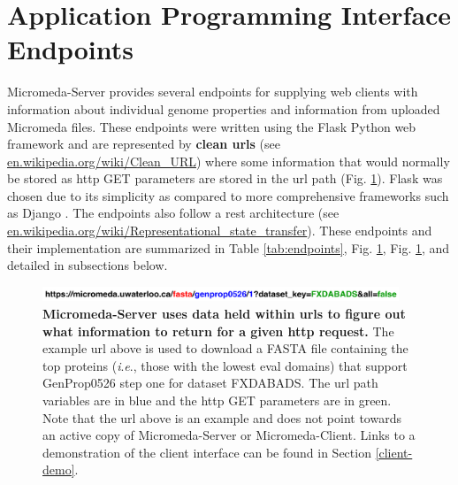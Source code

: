 \section{Application Programming Interface Endpoints} \label{endpoints}

Micromeda-Server provides several endpoints for supplying web clients with 
information about individual genome properties and information from uploaded 
Micromeda files. These endpoints were written using the Flask Python web 
framework \cite{grinberg2018flask} and are represented by \textbf{clean 
\gls{url}s} (see 
\href{http://en.wikipedia.org/wiki/Clean_URL}{en.wikipedia.org/wiki/Clean\_URL}) 
where some information that would normally be stored as \gls{http} GET 
parameters are stored in the \gls{url} path (Fig. \ref{fig:endpoint-url}). Flask 
was chosen due to its simplicity as compared to more comprehensive frameworks 
such as Django \cite{holovaty2009definitive}. The endpoints also follow a 
\gls{rest} architecture \cite{fielding2000representational} (see 
\href{http://en.wikipedia.org/wiki/Representational_state_transfer}{en.wikipedia.org/wiki/Representational\_state\_transfer}). 
These endpoints and their implementation are summarized in Table 
\ref{tab:endpoints}, Fig. \ref{endpoints}, Fig. \ref{fig:endpoint-url}, and 
detailed in subsections below.

\begin{figure}[!ht]
  \centering
	\includegraphics[width=0.95\textwidth]{media/Coloured-Endpoint.pdf}
	 \caption[Micromeda-Server uses data held within URLs to figure out what 
information to return for a given HTTP request.]{\textbf{Micromeda-Server uses 
data held within \gls{url}s to figure out what information to return for a given 
\gls{http} request.} The example \gls{url} above is used to download a FASTA 
file containing the top proteins (\textit{i}.\textit{e}., those with the lowest \gls{eval} 
domains) that support GenProp0526 step one for dataset FXDABADS. The \gls{url} 
path variables are in blue and the \gls{http} GET parameters are in green. Note 
that the \gls{url} above is an example and does not point towards an active copy 
of Micromeda-Server or Micromeda-Client. Links to a demonstration of the client 
interface can be found in Section \ref{client-demo}.}
	 \label{fig:endpoint-url}
\end{figure}

